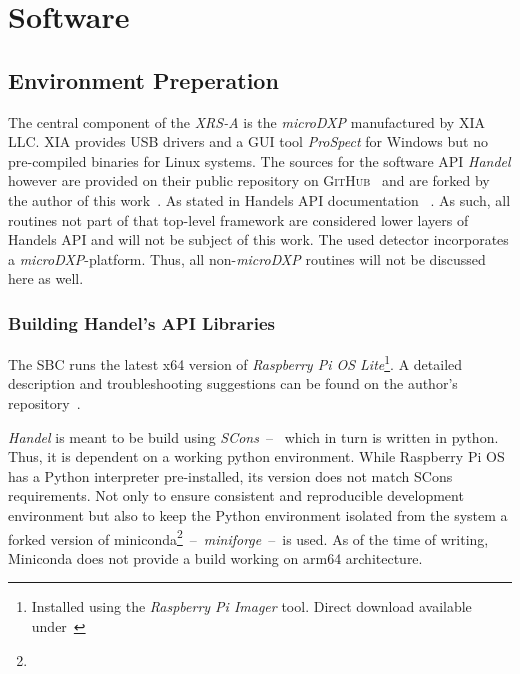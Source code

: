 \chapter{Software}
    \section{Environment Preperation}
        The central component of the \textit{XRS-A} is the \textit{microDXP} manufactured by \textsc{XIA LLC}.
        \textsc{XIA} provides USB drivers and a GUI tool \textit{ProSpect} for Windows but no pre-compiled binaries for Linux systems.
        The sources for the software API \textit{Handel} however are provided on their public repository on \textsc{GitHub}~\cite{Software.HandelRelease.2023} and are forked by the author of this work~\cite{Software.XraythesisHandel.2023}.
        As stated in Handels API documentation ~\cite{Manual.HandelAPIManual.Xiang}.
        As such, all routines not part of that top-level framework are considered lower layers of Handels API and will not be subject of this work.
        The used detector incorporates a \textit{microDXP}-platform.
        Thus, all non-\textit{microDXP} routines will not be discussed here as well.\par\medskip

        \subsection{Building Handel's API Libraries}\label{sec:software preperations}
            The SBC runs the latest x64 version of \textit{Raspberry Pi OS Lite}\footnote{Installed using the \textit{Raspberry Pi Imager} tool.
            Direct download available under~\cite{Software.RaspberryPiOSLite.2023}}.
            A detailed description and troubleshooting suggestions can be found on the author's repository~\cite{Software.XraythesisHandel.2023}.\par\medskip

            \textit{Handel} is meant to be build using \textit{SCons}~--~ which in turn is written in python.
            Thus, it is dependent on a working python environment.
            While Raspberry Pi OS has a Python interpreter pre-installed, its version does not match SCons requirements.
            Not only to ensure consistent and reproducible development environment but also to keep the Python environment isolated from the system a forked version of miniconda\footnote{}~--~\textit{miniforge}~--~is used.
            As of the time of writing, Miniconda does not provide a build working on arm64 architecture.

